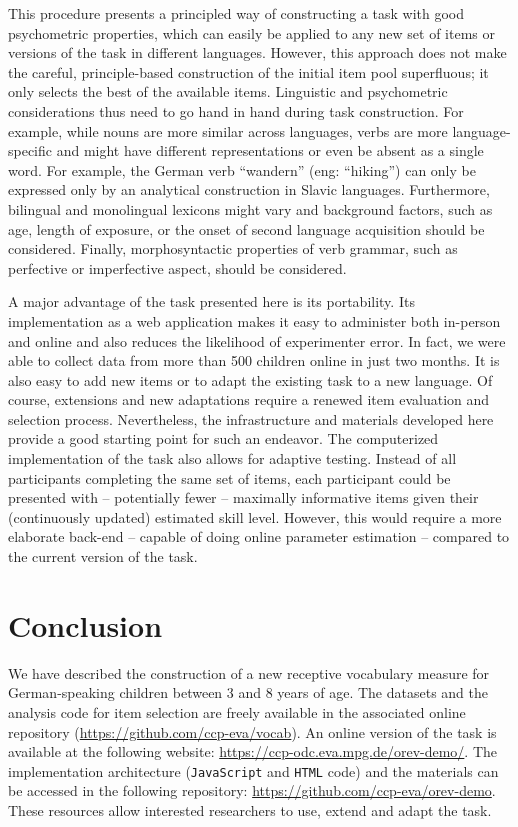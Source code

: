 \documentclass[
  man,floatsintext]{apa6}
\begin{document}
This procedure presents a principled way of constructing a task with good psychometric properties, which can easily be applied to any new set of items or versions of the task in different languages. However, this approach does not make the careful, principle-based construction of the initial item pool superfluous; it only selects the best of the available items. Linguistic and psychometric considerations thus need to go hand in hand during task construction. For example, while nouns are more similar across languages, verbs are more language-specific and might have different representations or even be absent as a single word. For example, the German verb ``wandern'' (eng: ``hiking'') can only be expressed only by an analytical construction in Slavic languages. Furthermore, bilingual and monolingual lexicons might vary and background factors, such as age, length of exposure, or the onset of second language acquisition should be considered. Finally, morphosyntactic properties of verb grammar, such as perfective or imperfective aspect, should be considered.

A major advantage of the task presented here is its portability. Its implementation as a web application makes it easy to administer both in-person and online and also reduces the likelihood of experimenter error. In fact, we were able to collect data from more than 500 children online in just two months. It is also easy to add new items or to adapt the existing task to a new language. Of course, extensions and new adaptations require a renewed item evaluation and selection process. Nevertheless, the infrastructure and materials developed here provide a good starting point for such an endeavor. The computerized implementation of the task also allows for adaptive testing. Instead of all participants completing the same set of items, each participant could be presented with -- potentially fewer -- maximally informative items given their (continuously updated) estimated skill level. However, this would require a more elaborate back-end -- capable of doing online parameter estimation -- compared to the current version of the task.

\hypertarget{conclusion}{%
\section{Conclusion}\label{conclusion}}

We have described the construction of a new receptive vocabulary measure for German-speaking children between 3 and 8 years of age. The datasets and the analysis code for item selection are freely available in the associated online repository (\url{https://github.com/ccp-eva/vocab}). An online version of the task is available at the following website: \url{https://ccp-odc.eva.mpg.de/orev-demo/}. The implementation architecture (\texttt{JavaScript} and \texttt{HTML} code) and the materials can be accessed in the following repository: \url{https://github.com/ccp-eva/orev-demo}. These resources allow interested researchers to use, extend and adapt the task.
\end{document}
